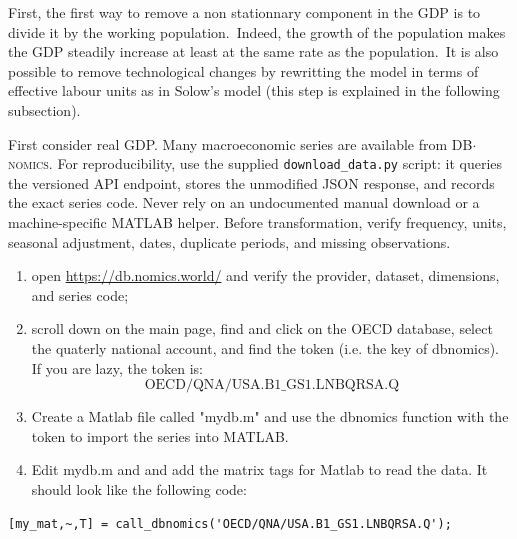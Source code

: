 \documentclass[a4paper,12pt]{article}%
\begin{document}
First, the first way to remove a non stationnary component in the GDP is to
divide it by the working population.\ Indeed, the growth of the population
makes the GDP steadily increase at least at the same rate as the
population.\ It is also possible to remove technological changes by rewritting
the model in terms of effective labour units as in Solow's model (this step is
explained in the following subsection).

First consider real GDP. Many macroeconomic series are available from
\textsc{DB}$\cdot$\textsc{nomics}. For reproducibility, use the supplied
\texttt{download\_data.py} script: it queries the versioned API endpoint,
stores the unmodified JSON response, and records the exact series code. Never
rely on an undocumented manual download or a machine-specific MATLAB helper.
Before transformation, verify frequency, units, seasonal adjustment, dates,
duplicate periods, and missing observations.

\begin{enumerate}
\item open \href{https://db.nomics.world/}{https://db.nomics.world/} and verify
the provider, dataset, dimensions, and series code;

\item scroll down on the main page, find and click on the OECD database,
select the quaterly national account, and find the token (i.e. the key of
dbnomics). If you are lazy, the token is:%
\[
\text{OECD/QNA/USA.B1\_GS1.LNBQRSA.Q}%
\]


\item Create a Matlab file called "\textsf{mydb.m}" and use the dbnomics
function with the token to import the series into MATLAB.

\item Edit \textsf{mydb.m} and and add the matrix tags for Matlab to read the
data. It should look like the following code:
\end{enumerate}

%

\vspace{1ex}
\begin{verbatim}
[my_mat,~,T] = call_dbnomics('OECD/QNA/USA.B1_GS1.LNBQRSA.Q');
\end{verbatim}
\vspace{1ex}%
\end{document}
